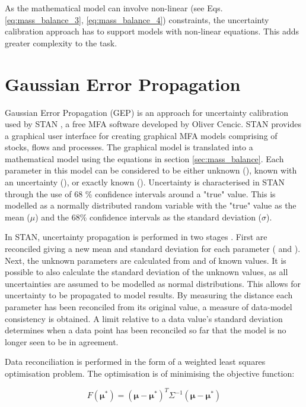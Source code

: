 \documentclass[ %
                    author={Tom Jager},
                supervisor={Dr. Daniel Schien},
                    degree={MEng},
                     title={A Bayesian Inference Engine for Calibrating Uncertainty over UMIS Structured MFA Systems},
                  subtitle={},
                      type={research},
                      year={2019} ]{dissertation}
\begin{document}
As the mathematical model can involve non-linear (see Eqs. \ref{eq:mass_balance_3}, \ref{eq:mass_balance_4}) constraints, the uncertainty calibration approach has to support models with non-linear equations. This adds greater complexity to the task.

\section{Gaussian Error Propagation}
Gaussian Error Propagation (GEP) is an approach for uncertainty calibration used by STAN \cite{cencic2008material}, a free MFA software developed by Oliver Cencic. STAN provides a graphical user interface for creating graphical MFA models comprising of stocks, flows and processes. The graphical model is translated into a mathematical model using the equations in section \ref{sec:mass_balance}. Each parameter in this model can be considered to be either unknown (), known with an uncertainty (),  or exactly known (). Uncertainty is characterised in STAN through the use of 68 \% confidence intervals around a "true" value. This is modelled as a normally distributed random variable with the "true" value as the mean ($\mu$) and the 68\% confidence intervals as the standard deviation ($\sigma$).

In STAN, uncertainty propagation is performed in two stages \cite{cencic2016nonlinear}. First  are reconciled giving a new mean and standard deviation for each parameter (\bm{$\mu^*$} and \bm{$\sigma^*$}). Next, the unknown parameters are calculated from \bm{$\mu^*$} and \bm{$\sigma^*$} of known values. It is possible to also calculate the standard deviation of the unknown values, as all uncertainties are assumed to be modelled as normal distributions. This allows for uncertainty to be propagated to model results. By measuring the distance each parameter has been reconciled from its original value, a measure of data-model consistency is obtained. A limit relative to a data value's standard deviation determines when a data point has been reconciled so far that the model is no longer seen to be in agreement.

Data reconciliation is performed in the form of a weighted least squares optimisation problem. The optimisation is of minimising the objective function: 

\begin{equation}
\label{eq:objective_function}
    F(\bm{\mu^*}) = (\bm{\mu} - \bm{\mu^*})^T \Sigma^{-1}(\bm{\mu} - \bm{\mu^*})
\end{equation}
\end{document}
